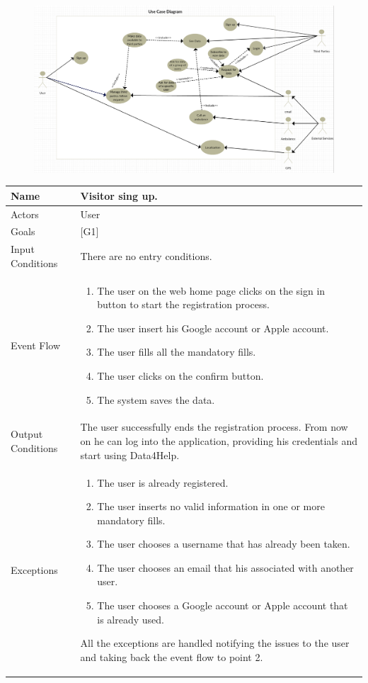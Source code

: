 \documentclass{article}
\begin{document}
\begin{figure}[h!]
\centering
    \textbf{}\par\medskip
	\includegraphics[width= \linewidth]{usecase.png}
\end{figure}
\begin{center}
    \begin{tabular}{ | l | p{10cm} |}
    \hline
    Name & Visitor sing up.\\ \hline
    Actors & User\\ \hline
   	Goals & {[G1]}\\ \hline
    Input Conditions & There are no entry conditions.\\ \hline
    Event Flow & \begin{enumerate}
    	\item The user on the web home page clicks on the sign in button to start the registration process.
    	\item The user insert his Google account or Apple account.
    	\item The user fills all the mandatory fills.
		\item The user clicks on the confirm button.
		\item The system saves the data.
    \end{enumerate} \\ \hline
    Output Conditions & The user successfully ends the registration process. From now on he can log into the application, providing his credentials and start using Data4Help. \\ \hline
    Exceptions & \begin{enumerate}
    	\item The user is already registered.
		\item The user inserts no valid information in one or more mandatory fills.
		\item The user chooses a username that has already been taken. 
		\item The user chooses an email that his associated with another user.
		\item The user chooses a Google account or Apple account that is already used.
	\end{enumerate}
All the exceptions are handled notifying the issues to the user and taking back the event flow to point 2.
    \\ \hline
    \end{tabular}
\end{center}
\end{document}
